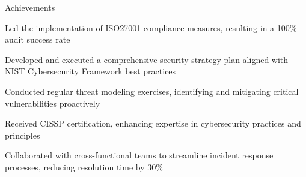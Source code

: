 \documentclass{resume} %
\begin{document}
    \begin{rSection}{Achievements}
        \begin{rSubsection}{}{}{}
                            \item Led the implementation of ISO27001 compliance measures, resulting in a 100\% audit success rate
                            \item Developed and executed a comprehensive security strategy plan aligned with NIST Cybersecurity Framework best practices
                            \item Conducted regular threat modeling exercises, identifying and mitigating critical vulnerabilities proactively
                            \item Received CISSP certification, enhancing expertise in cybersecurity practices and principles
                            \item Collaborated with cross{-}functional teams to streamline incident response processes, reducing resolution time by 30\%
                    \end{rSubsection}
    \end{rSection}
\end{document}
